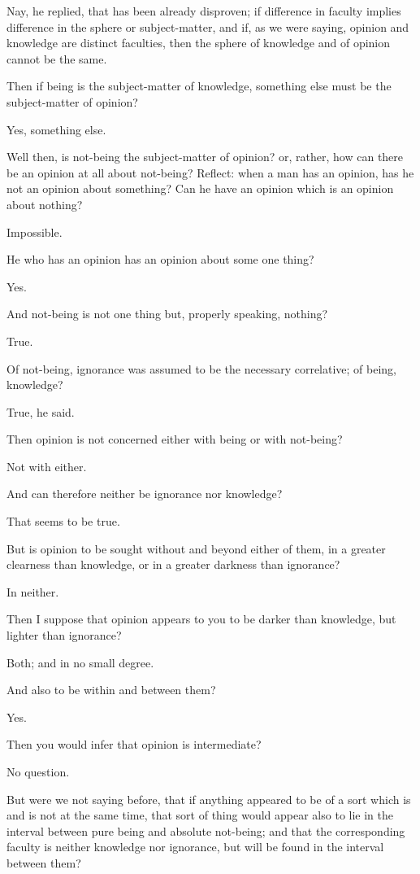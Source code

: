 Nay, he replied, that has been already disproven; if difference in
faculty implies difference in the sphere or subject-matter, and if, as
we were saying, opinion and knowledge are distinct faculties, then the
sphere of knowledge and of opinion cannot be the same.

Then if being is the subject-matter of knowledge, something else must be
the subject-matter of opinion?

Yes, something else.

Well then, is not-being the subject-matter of opinion? or, rather, how
can there be an opinion at all about not-being? Reflect: when a man
has an opinion, has he not an opinion about something? Can he have an
opinion which is an opinion about nothing?

Impossible.

He who has an opinion has an opinion about some one thing?

Yes.

And not-being is not one thing but, properly speaking, nothing?

True.

Of not-being, ignorance was assumed to be the necessary correlative; of
being, knowledge?

True, he said.

Then opinion is not concerned either with being or with not-being?

Not with either.

And can therefore neither be ignorance nor knowledge?

That seems to be true.

But is opinion to be sought without and beyond either of them, in
a greater clearness than knowledge, or in a greater darkness than
ignorance?

In neither.

Then I suppose that opinion appears to you to be darker than knowledge,
but lighter than ignorance?

Both; and in no small degree.

And also to be within and between them?

Yes.

Then you would infer that opinion is intermediate?

No question.

But were we not saying before, that if anything appeared to be of a sort
which is and is not at the same time, that sort of thing would appear
also to lie in the interval between pure being and absolute not-being;
and that the corresponding faculty is neither knowledge nor ignorance,
but will be found in the interval between them?

